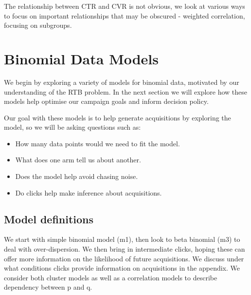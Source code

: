 \documentclass[11pt,a4,singlespacing,titlepagenumber=on]{scrreprt}
\numberwithin{equation}{chapter} %
\theoremstyle{remark}
\begin{document}
The relationship between CTR and CVR is not obvious, we look at various ways to focus on important relationships that may be obscured - weighted correlation, focusing on subgroups.


\chapter{Binomial Data Models}

We begin by exploring a variety of models for binomial data, motivated by our understanding of the RTB problem. In the next section we will explore how these models help optimise our campaign goals and inform decision policy.

Our goal with these models is to help generate acquisitions by exploring the model, so we will be asking questions such as:
\begin{itemize}
	\item How many data points would we need to fit the model.
	\item What does one arm tell us about another.
	\item Does the model help avoid chasing noise.
	\item Do clicks help make inference about acquisitions.
\end{itemize}





\section{Model definitions} 


We start with simple binomial model (m1), then look to beta binomial (m3) to deal with over-dispersion. We then bring in intermediate clicks, hoping these can offer more information on the likelihood of future acquisitions. We discuss under what conditions clicks provide information on acquisitions in the appendix. We consider both cluster models as well as a correlation models to describe dependency between p and q.
\end{document}
